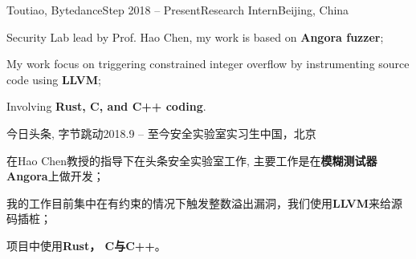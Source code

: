 \ifx\lang\eng
	\begin{rSubsection}{Toutiao, Bytedance}{Step 2018 – Present}{Research Intern}{Beijing, China}
		\item Security Lab lead by Prof. Hao Chen, my work is based on \textbf{Angora fuzzer};
		\item My work focus on triggering constrained integer overflow by instrumenting source code using \textbf{LLVM};
		\item Involving \textbf{Rust, C, and C++ coding}.
	\end{rSubsection}
\else
	\begin{rSubsection}{今日头条, 字节跳动}{2018.9 – 至今}{安全实验室实习生}{中国，北京}
		\item 在Hao Chen教授的指导下在头条安全实验室工作, 主要工作是在\textbf{模糊测试器 Angora}上做开发；
		\item 我的工作目前集中在有约束的情况下触发整数溢出漏洞，我们使用\textbf{LLVM}来给源码插桩；
		\item 项目中使用\textbf{Rust， C与C++}。
	\end{rSubsection}
\fi